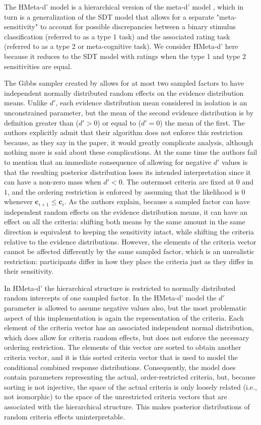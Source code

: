 \documentclass[a4paper,man,apacite,floatsintext]{apa6}
\begin{document}
The HMeta-d' model is a hierarchical version of the
meta-d' model \cite{maniscalco2012signal}, which in turn is a
generalization of the SDT model that allows for a separate
"meta-sensitivity" to account for possible discrepancies between a
binary stimulus classification (referred to as a type 1 task) and the
associated rating task (referred to as a type 2 or meta-cognitive
task). We consider HMeta-d' here because it reduces to the SDT model
with ratings when the type 1 and type 2 sensitivities are equal.

The Gibbs sampler created by  allows for
at most two sampled factors to have independent normally distributed
random effects on the evidence distribution means. Unlike $d'$, each
evidence distribution mean considered in isolation is an unconstrained
parameter, but the mean of the second evidence distribution is by
definition greater than ($d' > 0$) or equal to ($d' = 0$) the mean of
the first. The authors explicitly admit that their algorithm does not
enforce this restriction because, as they say in the paper, it would
greatly complicate analysis, although nothing more is said about these
complications. At the same time the authors fail to mention that an
immediate consequence of allowing for negative $d'$ values is that the
resulting posterior distribution loses its intended interpretation
since it can have a non-zero mass when $d' < 0$. The outermost
criteria are fixed at $0$ and $1$, and the ordering restriction is
enforced by assuming that the likelihood is $0$ whenever $\bm{c}_{i+1}
\leq \bm{c}_i$. As the authors explain, because a sampled factor can
have independent random effects on the evidence distribution means, it
can have an effect on all the criteria: shifting both means by the
same amount in the same direction is equivalent to keeping the
sensitivity intact, while shifting the criteria relative to the
evidence distributions. However, the elements of the criteria vector
cannot be affected differently by the same sampled factor, which is an
unrealistic restriction: participants differ in how they place the
criteria just as they differ in their sensitivity.

In HMeta-d' the hierarchical structure is restricted to normally
distributed random intercepts of one sampled factor. In the HMeta-d'
model the $d'$ parameter is allowed to assume negative values also,
but the most problematic aspect of this implementation is again the
representation of the criteria. Each element of the criteria vector
has an associated independent normal distribution, which does allow
for criteria random effects, but does not enforce the necessary
ordering restriction. The elements of this vector are sorted to obtain
another criteria vector, and it is this sorted criteria vector that is
used to model the conditional combined response
distributions. Consequently, the model does contain parameters
representing the actual, order-restricted criteria, but, because
sorting is not injective, the space of the actual criteria is only
loosely related (i.e., not isomorphic) to the space of the
unrestricted criteria vectors that are associated with the
hierarchical structure. This makes posterior distributions of random
criteria effects uninterpretable.
\end{document}
